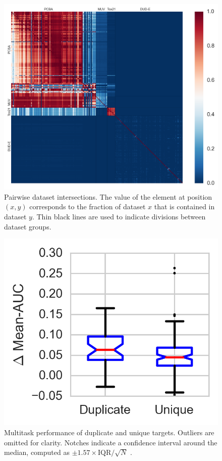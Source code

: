 \begin{figure}[ht]
\centering
\includegraphics[width=\linewidth]{Images/dataset_heatmap.png}
\caption{Pairwise dataset intersections. The value of the element at
  position $(x, y)$ corresponds to the fraction of dataset $x$ that is
  contained in dataset $y$. Thin black lines are used to indicate divisions
  between dataset groups.}
\label{fig:dataset_heatmap}
\end{figure}

\begin{figure}[ht]
\centering
\includegraphics[width=0.5\linewidth]{Images/duplicate.png}
\caption{Multitask performance of duplicate and unique targets. Outliers
  are omitted for clarity. Notches indicate a confidence interval around the
  median, computed as $\pm 1.57 \times \text{IQR}/ \sqrt{N}$
  \citep{mcgill1978variations}.}
\label{fig:duplicates}
\end{figure}

